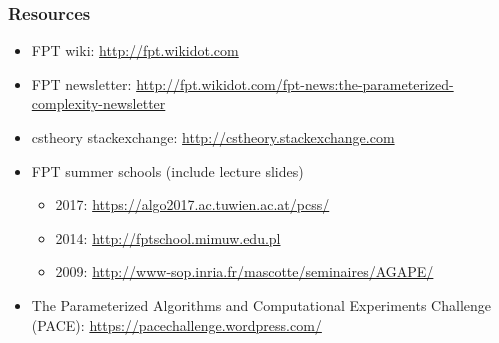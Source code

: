 \begin{frame}
 \frametitle{Resources}
 
 \begin{itemize}
  \item FPT wiki: \url{http://fpt.wikidot.com}
  \item FPT newsletter: \url{http://fpt.wikidot.com/fpt-news:the-parameterized-complexity-newsletter}
  \item cstheory stackexchange: \url{http://cstheory.stackexchange.com}
  \item FPT summer schools (include lecture slides)
  \begin{itemize}
  	\item 2017: \url{https://algo2017.ac.tuwien.ac.at/pcss/}
  	\item 2014: \url{http://fptschool.mimuw.edu.pl}
  	\item 2009: \url{http://www-sop.inria.fr/mascotte/seminaires/AGAPE/}
  \end{itemize}
  \item The Parameterized Algorithms and Computational Experiments Challenge (PACE): \url{https://pacechallenge.wordpress.com/}
 \end{itemize}

\end{frame}


\begin{frame}[t, allowframebreaks]
\printbibliography
\end{frame}



